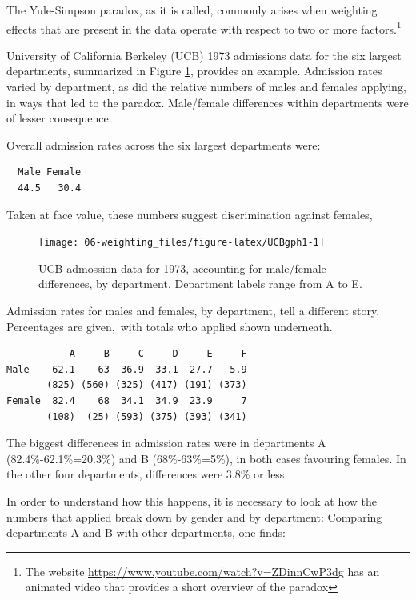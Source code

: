 \documentclass[
  10pt,
  b5paper]{book}
\begin{document}
The Yule-Simpson paradox, as it is called, commonly
arises when weighting effects that are present in the
data operate with respect to two or more
factors.\footnote{The website \url{https://www.youtube.com/watch?v=ZDinnCwP3dg}
  has an animated video that provides a short overview of the paradox}

University of California Berkeley (UCB)
1973 admissions data for the six largest departments,
summarized in Figure \ref{fig:UCBgph1}, provides an example.
Admission rates varied by department, as did the relative
numbers of males and females applying, in ways that led to the
paradox. Male/female differences within departments were of
lesser consequence.

Overall admission rates across the six largest departments were:

\begin{verbatim}
  Male Female 
  44.5   30.4 
\end{verbatim}

Taken at face value, these numbers suggest discrimination
against females,

\begin{figure}[H]

{\centering \texttt{[image: 06-weighting\_files/figure-latex/UCBgph1-1]} 

}

\caption{UCB admossion data for 1973, accounting for male/female differences, by department.  Department labels range from A to E.}\label{fig:UCBgph1}
\end{figure}

Admission rates for males and females, by department, tell a different
story. Percentages are given,~with totals who applied shown underneath.

\begin{verbatim}
           A     B     C     D     E     F
Male    62.1    63  36.9  33.1  27.7   5.9
       (825) (560) (325) (417) (191) (373)
Female  82.4    68  34.1  34.9  23.9     7
       (108)  (25) (593) (375) (393) (341)
\end{verbatim}

The biggest differences in admission rates were in departments
A (82.4\%-62.1\%=20.3\%) and B (68\%-63\%=5\%), in both cases favouring females.
In the other four departments, differences were 3.8\% or less.

In order to understand how this happens, it is necessary to look
at how the numbers that applied break down by gender and by department:
Comparing departments A and B with other departments, one finds:
\end{document}
